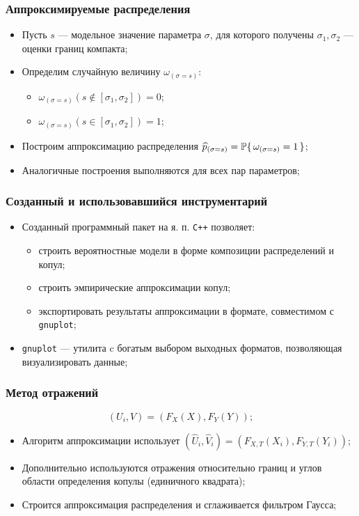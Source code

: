 \documentclass[11pt]{beamer}
\begin{document}
\begin{frame}
\begin{center}
\frametitle{Аппроксимируемые распределения}
\begin{itemize}
  \item Пусть $s$ --- модельное значение параметра $\sigma$, для которого получены $\sigma_1, \sigma_2$ --- оценки границ компакта;
  \item Определим случайную величину $\omega_{(\sigma = s)}$:
  \begin{itemize}
    \item $\omega_{(\sigma = s)}(s \notin [\sigma_1, \sigma_2]) = 0$;
    \item $\omega_{(\sigma = s)}(s \in [\sigma_1, \sigma_2]) = 1$;
  \end{itemize}
  \item Построим аппроксимацию распределения $\widehat{p}_{(\sigma = s)} = \P\{\, \omega_{(\sigma = s)} = 1\,\}$;
  \item Аналогичные построения выполняются для всех пар параметров;
\end{itemize}
\end{center}
\end{frame}

\begin{frame}
\begin{center}
\frametitle{Созданный и использовавшийся инструментарий}
\begin{itemize}
  \item Созданный программный пакет на я. п. \texttt{C++} позволяет:
    \begin{itemize}
      \item строить вероятностные модели в форме композиции распределений и копул;
      \item строить эмпирические аппроксимации копул;
      \item экспортировать результаты аппроксимации в формате, совместимом с \texttt{gnuplot};
    \end{itemize}
  \item \texttt{gnuplot} --- утилита c богатым выбором выходных форматов, позволяющая визуализировать данные;
\end{itemize}
\end{center}
\end{frame}

\begin{frame}
\frametitle{Метод отражений}
\begin{equation}
  ({U}_i, {V}) = (F_X(X), F_Y(Y));
\end{equation}
\begin{itemize}
  \item Алгоритм аппроксимации использует $(\widehat{U}_i, \widehat{V}_i) = (F_{X, T}(X_i), F_{Y, T}(Y_i))$;
  \item Дополнительно используются отражения относительно границ и углов области определения копулы (единичного квадрата);
  \item Строится аппроксимация распределения и сглаживается фильтром Гаусса;
\end{itemize}
\end{frame}
\end{document}
